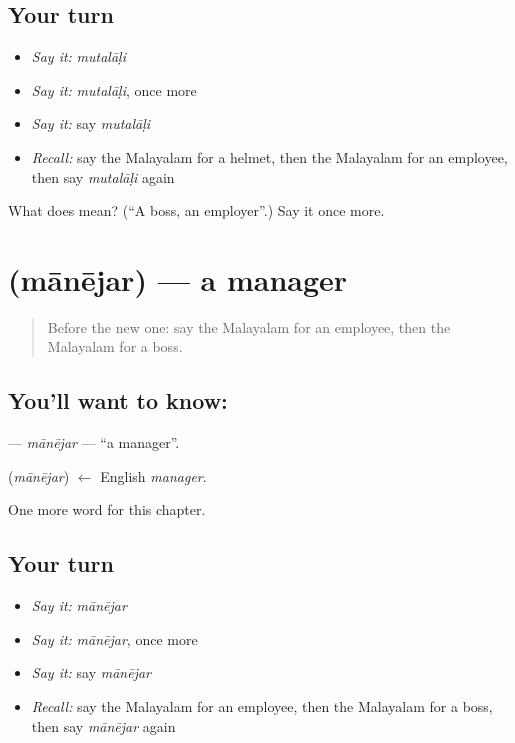 \subsection*{Your turn}
\begin{itemize}
\raggedright
  \item \emph{Say it:} \emph{mutalāḷi}
  \item \emph{Say it:} \emph{mutalāḷi}, once more
  \item \emph{Say it:} say \emph{mutalāḷi}
  \item \emph{Recall:} say the Malayalam for a helmet, then the Malayalam for an employee, then say \emph{mutalāḷi} again
\end{itemize}

\begin{tcolorbox}[breakable,colback=teal!4,colframe=teal!35!black,title={Before you move on}]
What does  mean? (\textquotedblleft{}A boss, an employer\textquotedblright{}.) Say it once more.
\end{tcolorbox}
\section[\texorpdfstring{\ml{മാനേജർ} (mānējar)}{മാനേജർ (mānējar)}]{ (mānējar) — a manager}

\label{lesson:ML-C334-manejar}



\begin{quote}
Before the new one: say the Malayalam for an employee, then the Malayalam for a boss.
\end{quote}

\subsection*{You'll want to know: }
\textbf{} — \emph{mānējar} — \textquotedblleft{}a manager\textquotedblright{}.

\begin{cousinweb}
\textbf{} (\emph{mānējar}) $\leftarrow$ English \emph{manager}.
\end{cousinweb}

\begin{grammarlens}[title={What you've built}]
One more word for this chapter.
\end{grammarlens}

\subsection*{Your turn}
\begin{itemize}
\raggedright
  \item \emph{Say it:} \emph{mānējar}
  \item \emph{Say it:} \emph{mānējar}, once more
  \item \emph{Say it:} say \emph{mānējar}
  \item \emph{Recall:} say the Malayalam for an employee, then the Malayalam for a boss, then say \emph{mānējar} again
\end{itemize}

